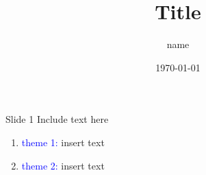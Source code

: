 \documentclass[12pt,aspectratio=169]{beamer}
\title{Title}
\date{\today}
\author{name}
\begin{document}
\maketitle


\begin{frame}{Slide 1}
Include text here
\begin{enumerate}
	\item \textcolor{blue}{theme 1:} insert text \vspace*{0.5em}
	\item \textcolor{blue}{theme 2:} insert text\vspace*{0.5em}
\end{enumerate}\vspace*{1em}
\end{frame}
\end{document}
